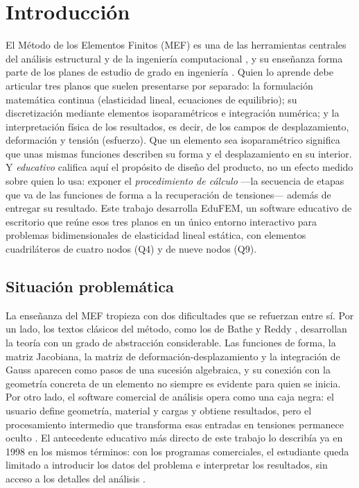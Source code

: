 \chapter*{Introducción}

El Método de los Elementos Finitos (MEF) es una de las herramientas centrales del análisis estructural y de la ingeniería computacional \autocite{zienkiewicz2013fem,cook2002concepts}, y su enseñanza forma parte de los planes de estudio de grado en ingeniería \autocite[p.~1160]{perezsantiago2023fem}. Quien lo aprende debe articular tres planos que suelen presentarse por separado: la formulación matemática continua (elasticidad lineal, ecuaciones de equilibrio); su discretización mediante elementos isoparamétricos e integración numérica; y la interpretación física de los resultados, es decir, de los campos de desplazamiento, deformación y tensión (esfuerzo). Que un elemento sea isoparamétrico significa que unas mismas funciones describen su forma y el desplazamiento en su interior. Y \emph{educativo} califica aquí el propósito de diseño del producto, no un efecto medido sobre quien lo usa: exponer el \emph{procedimiento de cálculo} ---la secuencia de etapas que va de las funciones de forma a la recuperación de tensiones--- además de entregar su resultado. Este trabajo desarrolla EduFEM, un software educativo de escritorio que reúne esos tres planos en un único entorno interactivo para problemas bidimensionales de elasticidad lineal estática, con elementos cuadriláteros de cuatro nodos (Q4) y de nueve nodos (Q9).

\section*{Situación problemática}

La enseñanza del MEF tropieza con dos dificultades que se refuerzan entre sí. Por un lado, los textos clásicos del método, como los de Bathe y Reddy \autocite{bathe2014fem,reddy2006introduction}, desarrollan la teoría con un grado de abstracción considerable. Las funciones de forma, la matriz Jacobiana, la matriz de deformación-desplazamiento y la integración de Gauss aparecen como pasos de una sucesión algebraica, y su conexión con la geometría concreta de un elemento no siempre es evidente para quien se inicia. Por otro lado, el software comercial de análisis opera como una caja negra: el usuario define geometría, material y cargas y obtiene resultados, pero el procesamiento intermedio que transforma esas entradas en tensiones permanece oculto \autocite[p.~1160]{perezsantiago2023fem}. El antecedente educativo más directo de este trabajo lo describía ya en 1998 en los mismos términos: con los programas comerciales, el estudiante queda limitado a introducir los datos del problema e interpretar los resultados, sin acceso a los detalles del análisis \autocite[p.~246]{suarez1998edelas2d}.

